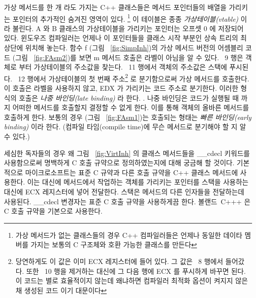  가상 메서드를 한 개 라도 가지는 C++ 클래스들은 메서드 포인터들의 배열을
가리키는 포인터의 추가적인 숨겨진 영역이 있다. \footnote{가상 메서드가 없는 클래스들의 경우
C++ 컴파일러들은 언제나 동일한 데이타 멤버를 가지는 보통의 C 구조체와 호환 가능한 클래스를
만든다} 이 테이블은 종종 \emph{가상테이블(vtable)} 이라 불린다. {\code A} 와 {\code B} 클래스의 가상테이블을 가리키는 포인터는
오프셋 0 에 저장되어 있다. 윈도우즈 컴파일러는 언제나 이 포인터들을 클래스 시작 부분인 상속 트리의 최상단에 위치해
놓는다. 함수 {\code f} (그림 ~\ref{fig:SimpInh})의 가상 메서드 버전의 어셈블리 코드 (그림 ~\ref{fig:FAsm2})를
보면 {\code m} 메서드 호출은 라벨이 아님을 알 수 있다. ~9 행은 객체로 부터 가상테이블의 주소값을 찾는다.
~11 행에서 객체의 주소값은 스택에 푸시된다. ~12 행에서 가상테이블의 첫 번째 주소\footnote{당연하게도 이 값은 이미 
{\code ECX} 레지스터에 들어 있다. 그 값은 ~8 행에서 들어갔다. 또한 ~10 행을 제거하는 대신에 그 다음 행에
{\code ECX} 를 푸시하게 바꾸면 된다. 이 코드는 별로 효율적이지 않는데 왜냐하면 컴파일러 최적화 옵션이
켜지지 않은 채 생성된 코드 이기 대문이다} 로 분기함으로써 가상 메서드를 호출한다.  이 호출은 라벨을 사용하지 않고,
{\code EDX} 가 가리키는 코드 주소로 분기한다. 이러한 형식의 호출은 \emph{나중 바인딩(late binding)} 라 한다. 
. 나중 바인딩은 코드가 실행될 때 까지 어떠한 메서드를 호출할지 결정할 수 없게 한다. 
이를 통해 객체의 올바른 메서드를 호출하게 한다. 보통의 경우 (그림 ~\ref{fig:FAsm1})는
호출되는 형태는 \emph{빠른 바인딩(early binding)} 이라 한다.  
(컴파일 타임(compile time)에 무슨 메서드로 분기해야 할 지 알 수 있다.)

세심한 독자들의 경우 왜 그림 ~\ref{fig:VirtInh} 의 클래스 메서드들을 {\code \_\_cdecl} 키워드를 사용함으로써  
명백하게 C 호출 규약으로 정의하였는지에 대해 궁금해 할 것이다. 기본적으로 마이크로소프트는 표준 C 규약과 다른
호출 규약을 C++ 클래스 메서드에 사용한다. 이는 대신에 메서드에서 작업하는 객체를 가리키는 포인터를 스택을 사용하는 대신에 {\code ECX} 레지스터에
넣어 전달한다. 스택은 메서드의 다른 인자들을 전달하는데 사용된다. {\code \_\_cdecl} 변경자는 표준 C 
호출 규약을 사용하게끔 한다. 볼랜드~C+++ 은 C 호출 규약을 기본으로 사용한다. 

